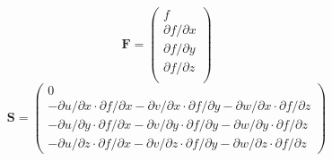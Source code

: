 \begin{equation}
\textbf{F}=
\begin{pmatrix}
f \\ \partial f/\partial x \\ \partial f/\partial y \\ \partial f/\partial z \\
\end{pmatrix}
\end{equation}
\begin{equation}
\textbf{S}=
\begin{pmatrix}
0
\\ -\partial u /\partial x \cdot \partial f/\partial x-\partial v /\partial x \cdot \partial f/\partial
y-\partial w /\partial x \cdot \partial f/\partial z
\\ -\partial u /\partial y \cdot \partial f/\partial x-\partial v /\partial y \cdot \partial f/\partial
y-\partial w /\partial y \cdot \partial f/\partial z
\\ -\partial u /\partial z \cdot \partial f/\partial x-\partial v /\partial z \cdot \partial f/\partial
y-\partial w /\partial z \cdot \partial f/\partial z
\end{pmatrix}
\end{equation}

